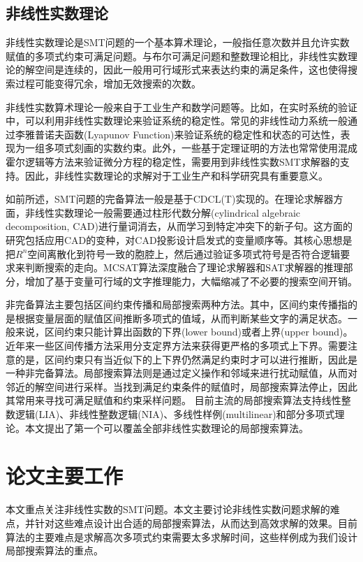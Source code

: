 \subsection{非线性实数理论}
非线性实数理论是SMT问题的一个基本算术理论，一般指任意次数并且允许实数赋值的多项式约束可满足问题。与布尔可满足问题和整数理论相比，非线性实数理论的解空间是连续的，因此一般用可行域形式来表达约束的满足条件，这也使得搜索过程可能变得冗余，增加无效搜索的次数。

非线性实数算术理论一般来自于工业生产和数学问题等。比如，在实时系统的验证中，可以利用非线性实数理论来验证系统的稳定性\cite{CPS1,CPS2,CPS3}。常见的非线性动力系统一般通过李雅普诺夫函数(Lyapunov Function)来验证系统的稳定性和状态的可达性，表现为一组多项式刻画的实数约束。此外，一些基于定理证明的方法也常常使用混成霍尔逻辑等方法来验证微分方程的稳定性，需要用到非线性实数SMT求解器的支持。因此，非线性实数理论的求解对于工业生产和科学研究具有重要意义。

如前所述，SMT问题的完备算法一般是基于CDCL(T)实现的。在理论求解器方面，非线性实数理论一般需要通过柱形代数分解(cylindrical algebraic decomposition, CAD)\cite{Caviness2004QuantifierEA}进行量词消去，从而学习到特定冲突下的新子句。这方面的研究包括应用CAD的变种\cite{AbrahamDEK21}，对CAD投影设计启发式的变量顺序\cite{LiXZZ23}等。其核心思想是把$R^n$空间离散化到符号一致的胞腔上，然后通过验证多项式符号是否符合逻辑要求来判断搜索的走向。MCSAT算法深度融合了理论求解器和SAT求解器的推理部分，增加了基于变量可行域的文字推理能力，大幅缩减了不必要的搜索空间开销。

非完备算法主要包括区间约束传播和局部搜索两种方法。其中，区间约束传播指的是根据变量层面的赋值区间推断多项式的值域，从而判断某些文字的满足状态。一般来说，区间约束只能计算出函数的下界(lower bound)或者上界(upper bound)。近年来一些区间传播方法采用分支定界方法来获得更严格的多项式上下界。需要注意的是，区间约束只有当近似下的上下界仍然满足约束时才可以进行推断，因此是一种非完备算法。局部搜索算法则是通过定义操作和邻域来进行扰动赋值，从而对邻近的解空间进行采样。当找到满足约束条件的赋值时，局部搜索算法停止，因此其常用来寻找可满足赋值和约束采样问题。
目前主流的局部搜索算法支持线性整数逻辑(LIA)\cite{CaiLZ22}、非线性整数逻辑(NIA)\cite{CaiLZ2023}、多线性样例(multilinear)\cite{multilinear}和部分多项式理论\cite{LiXZ23}。本文提出了第一个可以覆盖全部非线性实数理论的局部搜索算法。

\section{论文主要工作}
本文重点关注非线性实数的SMT问题。本文主要讨论非线性实数问题求解的难点，并针对这些难点设计出合适的局部搜索算法，从而达到高效求解的效果。目前算法的主要难点是求解高次多项式约束需要太多求解时间，这些样例成为我们设计局部搜索算法的重点。

